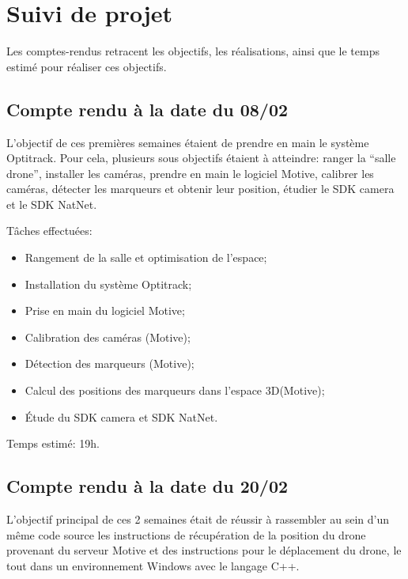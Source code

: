 \chapter{Suivi de projet}
Les comptes-rendus retracent les objectifs, les réalisations, ainsi que le temps estimé pour réaliser ces objectifs.

\section{Compte rendu à la date du 08/02}
L'objectif de ces premières semaines étaient de prendre en main le système Optitrack. Pour cela, plusieurs sous objectifs étaient à atteindre: ranger la ``salle drone'', installer les caméras, prendre en main le logiciel Motive, calibrer les caméras, détecter les marqueurs et obtenir leur position, étudier le SDK camera et le SDK NatNet.

Tâches effectuées:
\begin{itemize}
	\item Rangement de la salle et optimisation de l'espace;
	\item Installation du système Optitrack;
	\item Prise en main du logiciel Motive;
	\item Calibration des caméras (Motive);
	\item Détection des marqueurs (Motive);
	\item Calcul des positions des marqueurs dans l'espace 3D\@ (Motive);
	\item Étude du SDK camera et SDK NatNet. \\
\end{itemize}

Temps estimé: 19h.


\section{Compte rendu à la date du 20/02}
L'objectif principal de ces 2 semaines était de réussir à rassembler au sein d'un même code source les instructions de récupération de la position du drone provenant du serveur Motive et des instructions pour le déplacement du drone, le tout dans un environnement Windows avec le langage C++.

